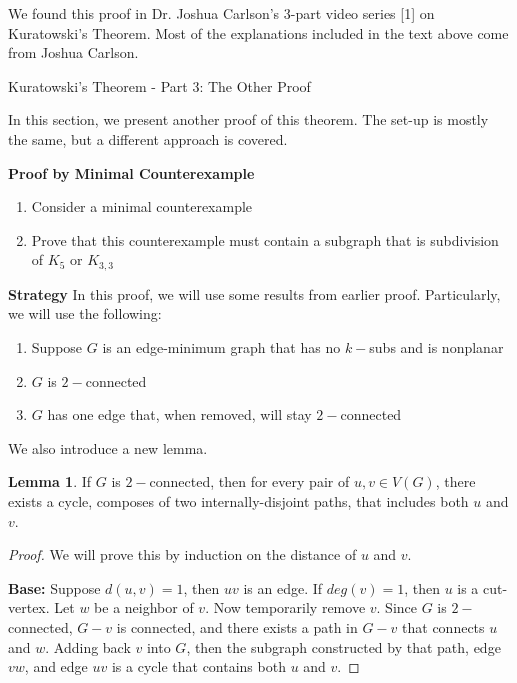\documentclass[12pt]{article}
\theoremstyle{definition}
\newtheorem{lem}{Lemma}[section]
\begin{document}
\noindent We found this proof in Dr. Joshua Carlson's 3-part video series [1] on Kuratowski's Theorem. Most of the explanations included in the text above come from Joshua Carlson.

\begin{section}{Kuratowski's Theorem - Part 3: The Other Proof}

In this section, we present another proof of this theorem. The set-up is mostly the same, but a different approach is covered.

\textbf{Proof by Minimal Counterexample}

\begin{enumerate}
    \item Consider a minimal counterexample
    \item Prove that this counterexample must contain a subgraph that is subdivision of $K_5$ or $K_{3,3}$
\end{enumerate}


\textbf{Strategy}
In this proof, we will use some results from earlier proof. Particularly, we will use the following:

\begin{enumerate}
    \item Suppose $G$ is an edge-minimum graph that has no $k-$subs and is nonplanar
    \item $G$ is $2-$connected
    \item $G$ has one edge that, when removed, will stay $2-$connected
\end{enumerate}

We also introduce a new lemma.

\begin{greenbox}
\begin{lem}
If $G$ is $2-$connected, then for every pair of $u,v \in V(G)$, there exists a cycle, composes of two internally-disjoint paths, that includes both $u$ and $v$.
\end{lem}
\end{greenbox}

\begin{proof}
We will prove this by induction on the distance of $u$ and $v$.

\textbf{Base:} Suppose $d(u, v) = 1$, then $uv$ is an edge. If $deg(v) = 1$, then $u$ is a cut-vertex. Let $w$ be a neighbor of $v$. Now temporarily remove $v$. Since $G$ is $2-$connected, $G- v$ is connected, and there exists a path in $G-v$ that connects $u$ and $w$. Adding back $v$ into $G$, then the subgraph constructed by that path, edge $vw$, and edge $uv$ is a cycle that contains both $u$ and $v$.


\end{proof}
\end{section}
\end{document}
